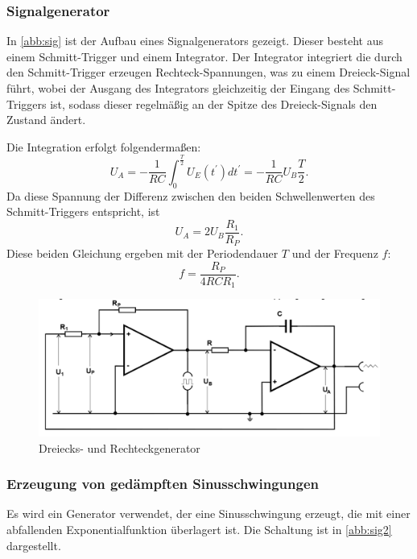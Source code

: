\subsubsection{Signalgenerator}
In \autoref{abb:sig} ist der Aufbau eines Signalgenerators gezeigt. Dieser besteht aus einem Schmitt-Trigger und einem Integrator. Der Integrator integriert die durch den Schmitt-Trigger erzeugen Rechteck-Spannungen, was zu einem Dreieck-Signal führt, wobei der Ausgang des Integrators gleichzeitig der Eingang des Schmitt-Triggers ist, sodass dieser regelmäßig an der Spitze des Dreieck-Signals den Zustand ändert.

Die Integration erfolgt folgendermaßen:
\begin{equation}
U_A = - \frac{1}{RC} \int_{0}^{\frac{T}{2}} U_E(t^\prime)dt^\prime = -\frac{1}{RC} U_B \frac{T}{2} .
\end{equation}
Da diese Spannung der Differenz zwischen den beiden Schwellenwerten des Schmitt-Triggers entspricht, ist
\begin{equation}
U_A = 2U_B\frac{R_1}{R_P} .
\end{equation}
Diese beiden Gleichung ergeben mit der Periodendauer $T$ und der Frequenz $f$:
\begin{equation}
f = \frac{R_P}{4RCR_1} .
\end{equation}

\begin{figure}[h!]
 	\centering
 	\includegraphics[width=\textwidth]{img/gen.png}
 	\caption{Dreiecks- und Rechteckgenerator \cite{FP}}
 	\label{abb:sig}
\end{figure}

\subsubsection{Erzeugung von ged{\"a}mpften Sinusschwingungen}
Es wird ein Generator verwendet, der eine Sinusschwingung erzeugt, die mit einer abfallenden Exponentialfunktion überlagert ist. Die Schaltung ist in \autoref{abb:sig2} dargestellt.

